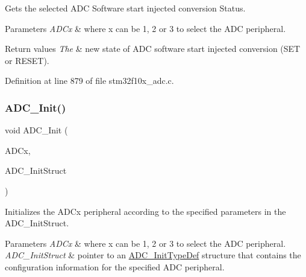 Gets the selected A\+DC Software start injected conversion Status. 


\begin{DoxyParams}{Parameters}
{\em A\+D\+Cx} & where x can be 1, 2 or 3 to select the A\+DC peripheral. \\
\hline
\end{DoxyParams}

\begin{DoxyRetVals}{Return values}
{\em The} & new state of A\+DC software start injected conversion (S\+ET or R\+E\+S\+ET). \\
\hline
\end{DoxyRetVals}


Definition at line 879 of file stm32f10x\+\_\+adc.\+c.

\mbox{\label{group___a_d_c___exported___functions_gabbab6038cf8691404350625e477254f9}} 
\subsubsection{\texorpdfstring{A\+D\+C\+\_\+\+Init()}{ADC\_Init()}}
{\footnotesize\ttfamily void A\+D\+C\+\_\+\+Init (\begin{DoxyParamCaption}\item[{\hyperlink{struct_a_d_c___type_def}{A\+D\+C\+\_\+\+Type\+Def} $\ast$}]{A\+D\+Cx,  }\item[{\hyperlink{struct_a_d_c___init_type_def}{A\+D\+C\+\_\+\+Init\+Type\+Def} $\ast$}]{A\+D\+C\+\_\+\+Init\+Struct }\end{DoxyParamCaption})}



Initializes the A\+D\+Cx peripheral according to the specified parameters in the A\+D\+C\+\_\+\+Init\+Struct. 


\begin{DoxyParams}{Parameters}
{\em A\+D\+Cx} & where x can be 1, 2 or 3 to select the A\+DC peripheral. \\
\hline
{\em A\+D\+C\+\_\+\+Init\+Struct} & pointer to an \hyperlink{struct_a_d_c___init_type_def}{A\+D\+C\+\_\+\+Init\+Type\+Def} structure that contains the configuration information for the specified A\+DC peripheral. \\
\hline
\end{DoxyParams}

